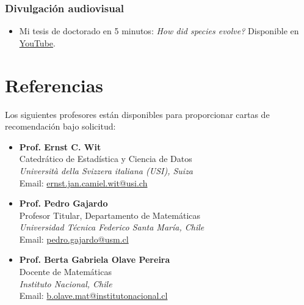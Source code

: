 \documentclass[11pt,a4paper]{article}
\begin{document}
\subsubsection{Divulgación audiovisual}

\begin{itemize}
    \item Mi tesis de doctorado en 5 minutos: \textit{How did species evolve?} Disponible en \href{https://www.youtube.com/watch?v=0RwCzOyzBXY}{YouTube}.
\end{itemize}

\section{Referencias}

Los siguientes profesores están disponibles para proporcionar cartas de recomendación bajo solicitud:

\begin{itemize}
    \item \textbf{Prof. Ernst C. Wit} \\
    Catedrático de Estadística y Ciencia de Datos \\
    \textit{Università della Svizzera italiana (USI), Suiza} \\
    Email: \href{mailto:ernst.jan.camiel.wit@usi.ch}{ernst.jan.camiel.wit@usi.ch}

    \item \textbf{Prof. Pedro Gajardo} \\
    Profesor Titular, Departamento de Matemáticas \\
    \textit{Universidad Técnica Federico Santa María, Chile} \\
    Email: \href{mailto:pedro.gajardo@usm.cl}{pedro.gajardo@usm.cl}

 

    \item \textbf{Prof. Berta Gabriela Olave Pereira} \\
    Docente de Matemáticas \\
    \textit{Instituto Nacional, Chile} \\
    Email: \href{mailto:b.olave.mat@institutonacional.cl}{b.olave.mat@institutonacional.cl}

\end{itemize}

\end{document}
